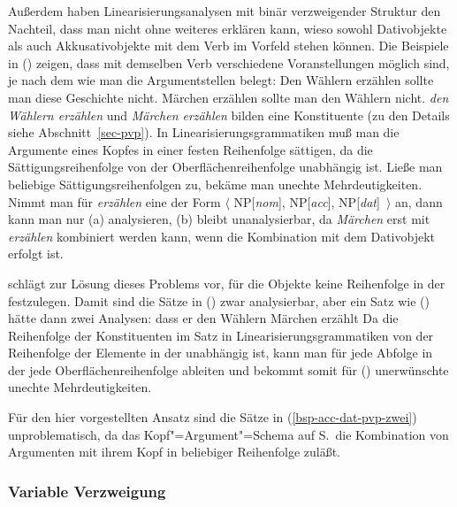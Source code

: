 %
Außerdem haben Linearisierungsanalysen mit binär verzweigender Struktur den Nachteil,
dass man nicht ohne weiteres erklären kann,
wieso sowohl Dativobjekte als auch Akkusativobjekte mit dem Verb im Vorfeld stehen können.
Die Beispiele in () zeigen, dass mit demselben Verb verschiedene Voranstellungen möglich sind,
je nach dem wie man die Argumentstellen belegt:
\eal
\label{bsp-acc-dat-pvp-zwei}
\ex Den Wählern erzählen sollte man diese Geschichte nicht.
\ex Märchen erzählen sollte man den Wählern nicht.
\zl
\emph{den Wählern erzählen} und \emph{Märchen erzählen} bilden eine Konstituente (zu den Details
siehe Abschnitt~\ref{sec-pvp}). In Linearisierungsgrammatiken muß man die Argumente eines Kopfes
in einer festen Reihenfolge sättigen, da die Sättigungsreihenfolge von der Oberflächenreihenfolge unabhängig ist. Ließe
man beliebige Sättigungsreihenfolgen zu, bekäme man unechte Mehrdeutigkeiten.
Nimmt man für \emph{erzählen} eine \compsl der Form $\langle$ NP[\textit{nom}], NP[\textit{acc}],
NP[\textit{dat}]~$\rangle$ an, dann kann man nur (a) analysieren, (b) bleibt unanalysierbar,
da \emph{Märchen} erst mit \emph{erzählen} kombiniert werden kann, wenn die Kombination
mit dem Dativobjekt erfolgt ist.

\citet[]{Kathol2000a} schlägt zur Lösung dieses Problems vor,
für die Objekte keine Reihenfolge in der \compsl festzulegen. Damit sind
die Sätze in () zwar analysierbar, aber ein Satz wie () hätte
dann zwei Analysen:
\ea
dass er den Wählern Märchen erzählt
\z
Da die Reihenfolge der Konstituenten im Satz in Linearisierungsgrammatiken
von der Reihenfolge der Elemente in der \compsl unabhängig ist, kann man
für jede Abfolge in der \compsl jede Oberflächenreihenfolge ableiten und bekommt
somit für () unerwünschte unechte Mehrdeutigkeiten.

Für den hier vorgestellten Ansatz sind die Sätze in (\ref{bsp-acc-dat-pvp-zwei}) unproblematisch,
da das Kopf"=Argument"=Schema auf S.\,\pageref{schema-bin-prel2} die Kombination von Argumenten
mit ihrem Kopf in beliebiger Reihenfolge zuläßt.
%
%


\subsubsection{Variable Verzweigung}
\label{crysmann}

